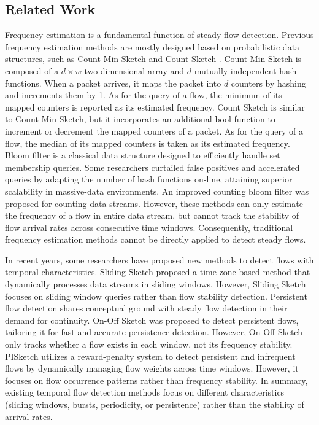 \documentclass[preprint,12pt]{elsarticle}
\begin{document}
\subsection{Related Work}
Frequency estimation is a fundamental function of steady flow detection. Previous frequency estimation methods are mostly designed based on probabilistic data structures, such as Count-Min Sketch \cite{b24} and Count Sketch \cite{b25}. Count-Min Sketch is composed of a $d \times w$ two-dimensional array and $d$ mutually independent hash functions. When a packet arrives, it maps the packet into $d$ counters by hashing and increments them by 1. As for the query of a flow, the minimum of its mapped counters is reported as its estimated frequency. Count Sketch is similar to Count-Min Sketch, but it incorporates an additional bool function to increment or decrement the mapped counters of a packet. As for the query of a flow, the median of its mapped counters is taken as its estimated frequency. Bloom filter \cite{b26} is a classical data structure designed to efficiently handle set membership queries. Some researchers \cite{b27} curtailed false positives and accelerated queries by adapting the number of hash functions on-line, attaining superior scalability in massive-data environments. An improved counting bloom filter \cite{b28} was proposed for counting data streams. However, these methods can only estimate the frequency of a flow in entire data stream, but cannot track the stability of flow arrival rates across consecutive time windows. Consequently, traditional frequency estimation methods cannot be directly applied to detect steady flows.

In recent years, some researchers have proposed new methods to detect flows with temporal characteristics. Sliding Sketch \cite{b29} proposed a time-zone-based method that dynamically processes data streams in sliding windows. However, Sliding Sketch focuses on sliding window queries rather than flow stability detection. Persistent flow detection shares conceptual ground with steady flow detection in their demand for continuity. On-Off Sketch \cite{b22} was proposed to detect persistent flows, tailoring it for fast and accurate persistence detection. However, On-Off Sketch only tracks whether a flow exists in each window, not its frequency stability. PISketch \cite{b19} utilizes a reward-penalty system to detect persistent and infrequent flows by dynamically managing flow weights across time windows. However, it focuses on flow occurrence patterns rather than frequency stability. In summary, existing temporal flow detection methods focus on different characteristics (sliding windows, bursts, periodicity, or persistence) rather than the stability of arrival rates.
\end{document}
